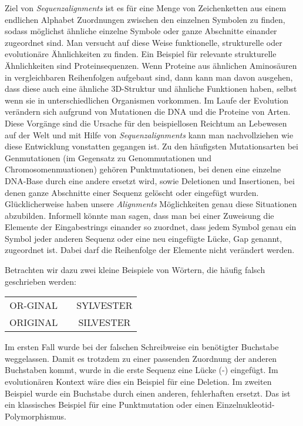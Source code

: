 Ziel von \emph{Sequenzalignments} ist es für eine Menge von Zeichenketten aus einem endlichen Alphabet Zuordnungen zwischen den einzelnen Symbolen zu finden, sodass möglichst ähnliche einzelne Symbole oder ganze Abschnitte einander zugeordnet sind. Man versucht auf diese Weise funktionelle, strukturelle oder evolutionäre Ähnlichkeiten zu finden. Ein Beispiel für relevante strukturelle Ähnlichkeiten sind Proteinsequenzen. Wenn Proteine aus ähnlichen Aminosäuren in vergleichbaren Reihenfolgen aufgebaut sind, dann kann man davon ausgehen, dass diese auch eine ähnliche 3D-Struktur und ähnliche Funktionen haben, selbst wenn sie in unterschiedlichen Organismen vorkommen. Im Laufe der Evolution verändern sich aufgrund von Mutationen die DNA und die Proteine von Arten. Diese Vorgänge sind die Ursache für den beispiellosen Reichtum an Lebewesen auf der Welt und mit Hilfe von \emph{Sequenzalignments} kann man nachvollziehen wie diese Entwicklung vonstatten gegangen ist. Zu den häufigsten Mutationsarten bei Genmutationen (im Gegensatz zu Genommutationen und Chromosomenmuationen) gehören Punktmutationen, bei denen eine einzelne DNA-Base durch eine andere ersetzt wird, sowie Deletionen und Insertionen, bei denen ganze Abschnitte einer Sequenz gelöscht oder eingefügt wurden. Glücklicherweise haben unsere \emph{Alignments} Möglichkeiten genau diese Situationen abzubilden. Informell könnte man sagen, dass man bei einer Zuweisung die Elemente der Eingabestrings einander so zuordnet, dass jedem Symbol genau ein Symbol jeder anderen Sequenz oder eine neu eingefügte Lücke, Gap genannt, zugeordnet ist. Dabei darf die Reihenfolge der Elemente nicht verändert werden.

Betrachten wir dazu zwei kleine Beispiele von Wörtern, die häufig falsch geschrieben werden:

\ttfamily
\begin{center}
\begin{tabular}{ccc}
		OR-GINAL & \hspace{2cm} & SYLVESTER \\
		ORIGINAL & \hspace{2cm} & SILVESTER
\end{tabular}
\end{center}
\normalfont

Im ersten Fall wurde bei der falschen Schreibweise ein benötigter Buchstabe weggelassen. Damit es trotzdem zu einer passenden Zuordnung der anderen Buchstaben kommt, wurde in die erste Sequenz eine Lücke (-) eingefügt. Im evolutionären Kontext wäre dies ein Beispiel für eine Deletion. Im zweiten Beispiel wurde ein Buchstabe durch einen anderen, fehlerhaften ersetzt. Das ist ein klassisches Beispiel für eine Punktmutation oder einen Einzelnukleotid-Polymorphismus.

